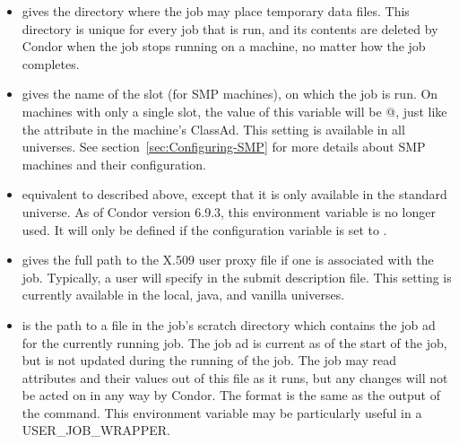 \begin{itemize}
\item {}
 gives the directory
where the job may place temporary data files. 
This directory is unique for every job that is run,
and its contents are deleted by Condor
when the job stops running on a machine, no matter how the job completes.

\item {}
gives the name of the slot (for SMP machines), on which the job is run.
On machines with only a single slot, the value of this variable will be
@, just like the  attribute in the machine's
ClassAd.
This setting is available in all universes.
See section~\ref{sec:Configuring-SMP} for more details about SMP
machines and their configuration.

\item {}
equivalent to  described above, except that it is
only available in the standard universe.
\Note As of Condor version 6.9.3, this environment variable is no longer
used.
It will only be defined if the  configuration
variable is set to .

\item {}
gives the full path to the X.509 user proxy file if one is
associated with the job.  Typically, a user will specify
 in the submit description file.
This setting is currently available in the
local, java, and vanilla universes.

\item {}
is the path to a file in the job's scratch directory which contains
the job ad for the currently running job.  The job ad is current
as of the start of the job, but is not updated during the running
of the job.  The job may read attributes and their values out of
this file as it runs, but any changes will not be acted on in any
way by Condor.  The format is the same as the output of the
   command.  This environment variable may be particularly
useful in a USER\_JOB\_WRAPPER.


\end{itemize}
